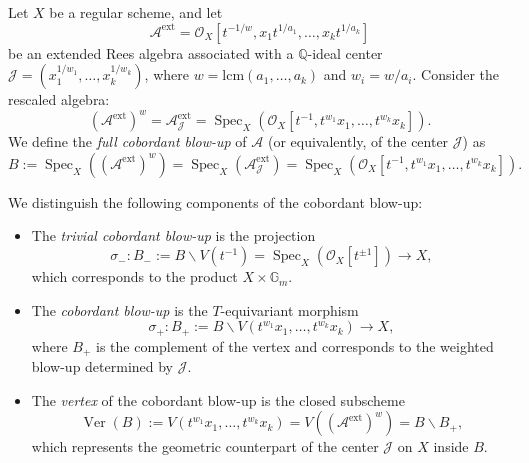 \documentclass{amsart}
\newcommand{\cJ}{{\mathcal J}}
\newcommand{\Spec}{\operatorname{Spec}}
\renewcommand{\setminus}{\smallsetminus}
\begin{document}
\begin{definition}
Let \( X \) be a regular scheme, and let
\[
\mathcal{A}^{\mathrm{ext}} = \mathcal{O}_X[t^{-1/w}, x_1 t^{1/a_1}, \ldots, x_k t^{1/a_k}]
\]
be an extended Rees algebra associated with a \(\mathbb{Q}\)-ideal center \( \mathcal{J} = (x_1^{1/w_1}, \ldots, x_k^{1/w_k}) \), where \( w = \mathrm{lcm}(a_1, \ldots, a_k) \) and \( w_i = w / a_i \). Consider the rescaled algebra:
\[
(\mathcal{A}^{\mathrm{ext}})^w = \mathcal{A}^{\mathrm{ext}}_{\mathcal{J}} = \Spec_X\left( \mathcal{O}_X[t^{-1}, t^{w_1} x_1, \ldots, t^{w_k} x_k] \right).
\]
We define the \emph{full cobordant blow-up} of \( \mathcal{A} \) (or equivalently, of the center \( \mathcal{J} \)) as
\[
B := \Spec_X\left( (\mathcal{A}^{\mathrm{ext}})^w \right) = \Spec_X\left( \mathcal{A}^{\mathrm{ext}}_{\mathcal{J}} \right) = \Spec_X\left( \mathcal{O}_X[t^{-1}, t^{w_1} x_1, \ldots, t^{w_k} x_k] \right).
\]

We distinguish the following components of the cobordant blow-up:

\begin{itemize}
    \item The \emph{trivial cobordant blow-up} is the projection
    \[
    \sigma_-: B_- := B \setminus V(t^{-1}) = \Spec_X\left( \mathcal{O}_X[t^{\pm 1}] \right) \longrightarrow X,
    \]
    which corresponds to the product \( X \times \mathbb{G}_m \).

    \item The \emph{cobordant blow-up} is the \( T \)-equivariant morphism
    \[
    \sigma_+: B_+ := B \setminus V(t^{w_1} x_1, \ldots, t^{w_k} x_k) \longrightarrow X,
    \]
    where \( B_+ \) is the complement of the vertex and corresponds to the weighted blow-up determined by \( \mathcal{J} \).

    \item The \emph{vertex} of the cobordant blow-up is the closed subscheme
    \[
    \operatorname{Ver}(B) := V(t^{w_1} x_1, \ldots, t^{w_k} x_k) = V\left( (\mathcal{A}^{\mathrm{ext}})^w \right) = B \setminus B_+,
    \]
    which represents the geometric counterpart of the center $\cJ$ on $X$ inside \( B \).     %
\end{itemize}
\end{definition}
\end{document}
